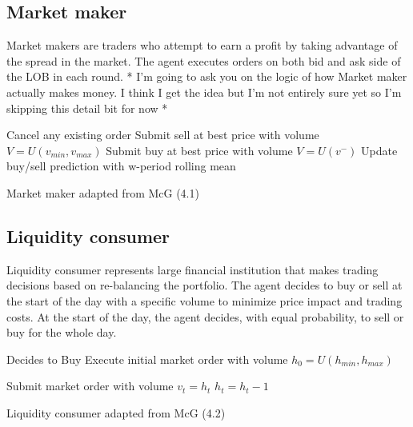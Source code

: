\subsection{Market maker}
Market makers are traders who attempt to earn a profit by taking advantage of the spread in the market. The agent executes orders on both bid and ask side of the LOB in each round. * I'm going to ask you on the logic of how Market maker actually makes money. I think I get the idea but I'm not entirely sure yet so I'm skipping this detail bit for now * 

\begin{algorithm}[H]
\DontPrintSemicolon 
{} {
    Cancel any existing order\;
     {
    Submit sell at best price with volume $V=U(v_{min},v_{max})$\;
    Submit buy at best price with volume $V=U(v^{-})$\;
    }
    \EndIf
  }
\EndIf
Update buy/sell prediction with w-period rolling mean\; 
\caption{{\sc Market maker adapted from McG (4.1) \cite{McGroarty}} }
\label{algo:max}
\end{algorithm}

\subsection{Liquidity consumer}
Liquidity consumer represents large financial institution that makes trading decisions based on re-balancing the portfolio. The agent decides to buy or sell at the start of the day with a specific volume to minimize price impact and trading costs. At the start of the day, the agent decides, with equal probability, to sell or buy for the whole day.

\begin{algorithm}[H]
\DontPrintSemicolon 
{} {
     {
    Decides to Buy\;
    }
    \EndIf
    Execute initial market order with volume $h_0 = U(h_{min},h_{max})$\;  
  }
\EndIf

 {
    \tcc{$h_t = $ is the remaining volume at time t}
     {
    Submit market order with volume $v_t = h_t$\;
    }
    \EndIf
    $h_t = h_t - 1$\;  
  }
\EndIf
\caption{{\sc Liquidity consumer adapted from McG (4.2) \cite{McGroarty} }}
\label{algo:max}
\end{algorithm}

